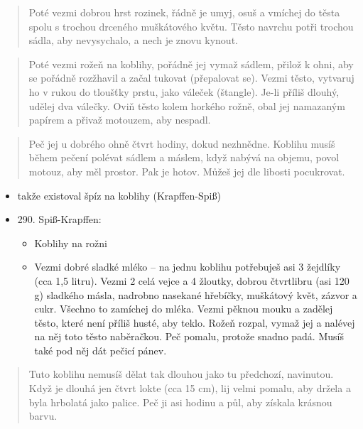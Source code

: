 \begin{quote}
Poté vezmi dobrou hrst rozinek, řádně je umyj, osuš a vmíchej do těsta
spolu s trochou drceného muškátového květu. Těsto navrchu potři trochou
sádla, aby nevysychalo, a nech je znovu kynout.
\end{quote}

\begin{quote}
Poté vezmi rožeň na koblihy, pořádně jej vymaž sádlem, přilož k ohni,
aby se pořádně rozžhavil a začal tukovat (přepalovat se). Vezmi těsto,
vytvaruj ho v rukou do tloušťky prstu, jako váleček (štangle). Je-li
příliš dlouhý, udělej dva válečky. Oviň těsto kolem horkého rožně, obal
jej namazaným papírem a přivaž motouzem, aby nespadl.
\end{quote}

\begin{quote}
Peč jej u dobrého ohně čtvrt hodiny, dokud nezhnědne. Koblihu musíš
během pečení polévat sádlem a máslem, když nabývá na objemu, povol
motouz, aby měl prostor. Pak je hotov. Můžeš jej dle libosti pocukrovat.
\end{quote}

\begin{itemize}
\tightlist
\item
  takže existoval špíz na koblihy (Krapffen-Spiß)
\end{itemize}

\begin{itemize}
\tightlist
\item
  290. Spiß-Krapffen:

  \begin{itemize}
  \tightlist
  \item
    Koblihy na rožni
  \item
    Vezmi dobré sladké mléko -- na jednu koblihu potřebuješ asi 3
    žejdlíky (cca 1,5 litru). Vezmi 2 celá vejce a 4 žloutky, dobrou
    čtvrtlibru (asi 120 g) sladkého másla, nadrobno nasekané hřebíčky,
    muškátový květ, zázvor a cukr. Všechno to zamíchej do mléka. Vezmi
    pěknou mouku a zadělej těsto, které není příliš husté, aby teklo.
    Rožeň rozpal, vymaž jej a nalévej na něj toto těsto naběračkou. Peč
    pomalu, protože snadno padá. Musíš také pod něj dát pečicí pánev.
  \end{itemize}
\end{itemize}

\begin{quote}
Tuto koblihu nemusíš dělat tak dlouhou jako tu předchozí, navinutou.
Když je dlouhá jen čtvrt lokte (cca 15 cm), lij velmi pomalu, aby držela
a byla hrbolatá jako palice. Peč ji asi hodinu a půl, aby získala
krásnou barvu.
\end{quote}

